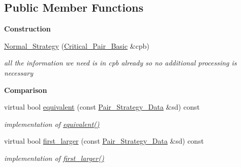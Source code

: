 \subsection*{Public Member Functions}
\begin{Indent}\textbf{ Construction}\par
\begin{DoxyCompactItemize}
\item 
\mbox{\label{class_normal___strategy_a6aa0afb9976f32afc9ae55d54d0ff9d4}} 
\hyperlink{class_normal___strategy_a6aa0afb9976f32afc9ae55d54d0ff9d4}{Normal\+\_\+\+Strategy} (\hyperlink{class_critical___pair___basic}{Critical\+\_\+\+Pair\+\_\+\+Basic} \&cpb)
\begin{DoxyCompactList}\small\item\em all the information we need is in {\ttfamily cpb} already so no additional processing is necessary \end{DoxyCompactList}\end{DoxyCompactItemize}
\end{Indent}
\begin{Indent}\textbf{ Comparison}\par
\begin{DoxyCompactItemize}
\item 
\mbox{\label{class_normal___strategy_a0e45af746d30c9608f48267aa2abb8d8}} 
virtual bool \hyperlink{class_normal___strategy_a0e45af746d30c9608f48267aa2abb8d8}{equivalent} (const \hyperlink{class_pair___strategy___data}{Pair\+\_\+\+Strategy\+\_\+\+Data} \&sd) const
\begin{DoxyCompactList}\small\item\em implementation of \hyperlink{class_normal___strategy_a0e45af746d30c9608f48267aa2abb8d8}{equivalent()} \end{DoxyCompactList}\item 
\mbox{\label{class_normal___strategy_a2bc1a890ee5e2bee455fd8226389c232}} 
virtual bool \hyperlink{class_normal___strategy_a2bc1a890ee5e2bee455fd8226389c232}{first\+\_\+larger} (const \hyperlink{class_pair___strategy___data}{Pair\+\_\+\+Strategy\+\_\+\+Data} \&sd) const
\begin{DoxyCompactList}\small\item\em implementation of \hyperlink{class_normal___strategy_a2bc1a890ee5e2bee455fd8226389c232}{first\+\_\+larger()} \end{DoxyCompactList}\end{DoxyCompactItemize}
\end{Indent}
